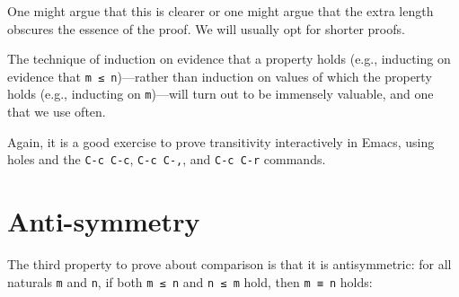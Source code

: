 One might argue that this is clearer or one might argue that the extra
length obscures the essence of the proof. We will usually opt for
shorter proofs.

The technique of induction on evidence that a property holds (e.g.,
inducting on evidence that \texttt{m\ ≤\ n})---rather than induction on
values of which the property holds (e.g., inducting on
\texttt{m})---will turn out to be immensely valuable, and one that we
use often.

Again, it is a good exercise to prove transitivity interactively in
Emacs, using holes and the \texttt{C-c\ C-c}, \texttt{C-c\ C-,}, and
\texttt{C-c\ C-r} commands.

\hypertarget{anti-symmetry}{%
\section{Anti-symmetry}\label{anti-symmetry}}

The third property to prove about comparison is that it is
antisymmetric: for all naturals \texttt{m} and \texttt{n}, if both
\texttt{m\ ≤\ n} and \texttt{n\ ≤\ m} hold, then \texttt{m\ ≡\ n} holds:

\begin{fence}
\begin{code}%
\>[0]\AgdaSpace{}%
\AgdaSymbol{:}\AgdaSpace{}%
\AgdaSpace{}%
\AgdaSymbol{\{}\AgdaSpace{}%
\AgdaSpace{}%
\AgdaSymbol{:}\AgdaSpace{}%
\AgdaSymbol{\}}\<%
\\
\>[0][@{}l@{\AgdaIndent{0}}]%
\>[2]\AgdaSpace{}%
\AgdaSpace{}%
\AgdaSpace{}%
\<%
\\
%
\>[2]%
\>[240I]\AgdaSpace{}%
\AgdaSpace{}%
\<%
\\
\>[.][@{}l@{}]\<[240I]%
\>[4]\AgdaComment{-----}\<%
\\
%
\>[2]\AgdaSpace{}%
\AgdaSpace{}%
\AgdaSpace{}%
\<%
\\
\>[0]\AgdaSpace{}%
%
\>[20]%
\>[31]\AgdaSymbol{=}%
\>[34]\<%
\\
\>[0]\AgdaSpace{}%
\AgdaSymbol{(}\AgdaSpace{}%
\AgdaSymbol{)}\AgdaSpace{}%
\AgdaSymbol{(}\AgdaSpace{}%
\AgdaSymbol{)}%
\>[31]\AgdaSymbol{=}%
\>[34]\AgdaSpace{}%
\AgdaSpace{}%
\AgdaSymbol{(}\AgdaSpace{}%
\AgdaSpace{}%
\AgdaSymbol{)}\<%
\end{code}
\end{fence}

